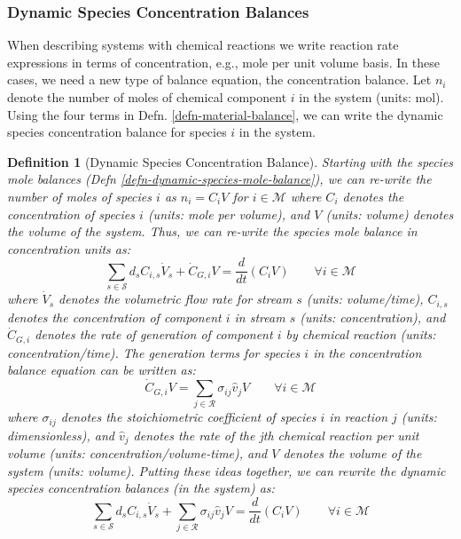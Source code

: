 \documentclass{article}[11pt]
\newtheorem{defn}{Definition}
\begin{document}
\subsubsection*{Dynamic Species Concentration Balances}
When describing systems with chemical reactions we write reaction rate expressions in terms of 
concentration, e.g., mole per unit volume basis.
In these cases, we need a new type of balance equation, the concentration balance. 
Let $n_{i}$ denote the number of moles of chemical component $i$ in the system (units: mol). 
Using the four terms in Defn. \ref{defn-material-balance}, we can write the dynamic species concentration balance for species $i$ in the system.

\begin{mdframed}
\begin{defn}[Dynamic Species Concentration Balance]\label{defn-dynamic-species-concentration-balance}
Starting with the species mole balances (Defn \ref{defn-dynamic-species-mole-balance}), we can re-write the number of moles of species $i$ as $n_{i} = C_{i}V$ for ${i}\in\mathcal{M}$
where $C_{i}$ denotes the concentration of species $i$ (units: mole per volume), and $V$ (units: volume) denotes the volume of the system. 
Thus, we can re-write the species mole balance in concentration units as:
\begin{equation}\label{eqn:concentration-balance}
\sum_{s\in\mathcal{S}}d_{s}C_{i,s}\dot{V}_{s} + \dot{C}_{G,i}V = \frac{d}{dt}\left(C_{i}V\right)\qquad\forall{i}\in\mathcal{M}
\end{equation}
where $\dot{V}_{s}$ denotes the volumetric flow rate for stream $s$ (units: volume/time), 
$C_{i,s}$ denotes the concentration of component $i$ in stream $s$ (units: concentration), 
and $\dot{C}_{G,i}$ denotes the rate of generation of component $i$ by chemical reaction (units: concentration/time).
The generation terms for species $i$ in the concentration balance equation can be written as:
\begin{equation}\label{eqn:concentration-gen-terms}
\dot{C}_{G,i}V = \sum_{j\in\mathcal{R}}\sigma_{ij}\hat{v}_{j}V\qquad\forall{i}\in\mathcal{M}
\end{equation}
where $\sigma_{ij}$ denotes the stoichiometric coefficient of species $i$ in reaction $j$ (units: dimensionless), 
and $\hat{v}_{j}$ denotes the rate of the jth chemical reaction per unit volume (units: concentration/volume-time), 
and $V$ denotes the volume of the system (units: volume).
Putting these ideas together, we can rewrite the dynamic species concentration balances (in the system) as:
\begin{equation}\label{eqn:concentration-balance-with-extent}
\sum_{s\in\mathcal{S}}d_{s}C_{i,s}\dot{V}_{s} + \sum_{j\in\mathcal{R}}\sigma_{ij}\hat{v}_{j}V = \frac{d}{dt}\left(C_{i}V\right)\qquad\forall{i\in\mathcal{M}}
\end{equation}
\end{defn}
\end{mdframed}
\end{document}
